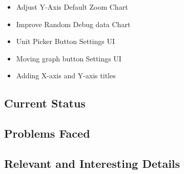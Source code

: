 \documentclass[onecolumn, draftclsnofoot,10pt, compsoc]{IEEEtran}
\begin{document}
\begin{itemize}
  \item Adjust Y-Axis Default Zoom Chart
  \item Improve Random Debug data Chart
  \item Unit Picker Button Settings UI
  \item Moving graph button Settings UI
  \item Adding X-axis and Y-axis titles
\end{itemize}

\subsection{Current Status}
\subsection{Problems Faced}
\subsection{Relevant and Interesting Details}

%
%
\end{document}
